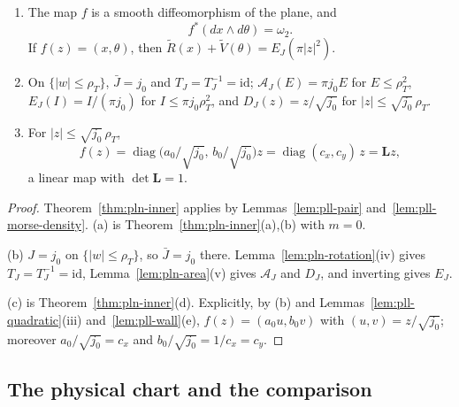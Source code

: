 \begin{proposition}\label{prop:pll-inner-map}
\leavevmode\par
\begin{enumerate}[label=(\alph*)]
\item The map $f$ is a smooth diffeomorphism of the plane, and
 \[
  f^*(dx\wedge d\theta)=\omega_2.
 \]
 If $f(z)=(x,\theta)$, then $\tilde R(x)+\tilde V(\theta)=E_J(\pi|z|^2)$.
\item On $\{|w|\le\rho_T\}$, $\bar J=j_0$ and $T_J=T_J^{-1}=\mathrm{id}$; $\mathcal A_J(E)=\pi j_0E$ for
 $E\le\rho_T^2$, $E_J(I)=I/(\pi j_0)$ for $I\le\pi j_0\rho_T^2$, and $D_J(z)=z/\sqrt{j_0}$ for
 $|z|\le\sqrt{j_0}\,\rho_T$.
\item For $|z|\le\sqrt{j_0}\,\rho_T$,
 \[
  f(z)=\operatorname{diag}\bigl(a_0/\sqrt{j_0},\,b_0/\sqrt{j_0}\bigr)z=\operatorname{diag}(c_x,c_y)\,z=\mathbf Lz,
 \]
 a linear map with $\det\mathbf L=1$.
\end{enumerate}
\end{proposition}

\begin{proof}
Theorem~\ref{thm:pln-inner} applies by Lemmas~\ref{lem:pll-pair} and~\ref{lem:pll-morse-density}. (a) is Theorem~\ref{thm:pln-inner}(a),(b) with $m=0$.

(b) $J=j_0$ on $\{|w|\le\rho_T\}$, so $\bar J=j_0$ there. Lemma~\ref{lem:pln-rotation}(iv) gives $T_J=T_J^{-1}=\mathrm{id}$, Lemma~\ref{lem:pln-area}(v) gives $\mathcal A_J$ and $D_J$, and inverting gives $E_J$.

(c) is Theorem~\ref{thm:pln-inner}(d). Explicitly, by (b) and Lemmas~\ref{lem:pll-quadratic}(iii) and~\ref{lem:pll-wall}(e), $f(z)=(a_0u,b_0v)$ with $(u,v)=z/\sqrt{j_0}$; moreover $a_0/\sqrt{j_0}=c_x$ and $b_0/\sqrt{j_0}=1/c_x=c_y$.
\end{proof}

\subsection{The physical chart and the comparison}\label{sec:pll-chart}

